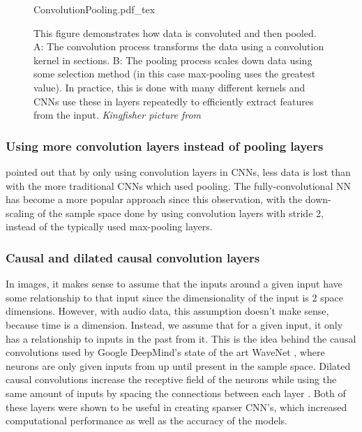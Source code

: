 \documentclass[12pt]{article}
\newcommand{\vectorimage}[1]{
    \def\svgwidth{5.5in}
    {#1.pdf_tex}
}
\begin{document}
	\begin{figure}[h!]
	    \centering
	    \vectorimage{ConvolutionPooling}
	    \caption{This figure demonstrates how data is convoluted and then pooled. A: The convolution process transforms the data using a convolution kernel in sections. B: The pooling process scales down data using some selection method (in this case max-pooling uses the greatest value). In practice, this is done with many different kernels and CNNs use these in layers repeatedly to efficiently extract features from the input. \textit{Kingfisher picture from \parencite{convolutionpooling}}}
	    \label{fig:convolution_pooling}
	\end{figure}
	
	\subsubsection{Using more convolution layers instead of pooling layers}
	\label{sec:strided_conv}
	
	\textcite{Springenberg2014} pointed out that by only using convolution layers in CNNs, less data is lost than with the more traditional CNNs which used pooling. The fully-convolutional NN has become a more popular approach since this observation, with the down-scaling of the sample space done by using convolution layers with stride 2, instead of the typically used max-pooling layers.\medskip
	
	\subsubsection{Causal and dilated causal convolution layers}
	\label{sec:dilated_causal_conv}
	
	In images, it makes sense to assume that the inputs around a given input have some relationship to that input since the dimensionality of the input is 2 space dimensions. However, with audio data, this assumption doesn't make sense, because time is a dimension. Instead, we assume that for a given input, it only has a relationship to inputs in the past from it. This is the idea behind the causal convolutions used by Google DeepMind's state of the art WaveNet \parencite{Oord2016}, where neurons are only given inputs from up until present in the sample space. Dilated causal convolutions increase the receptive field of the neurons while using the same amount of inputs by spacing the connections between each layer \parencite{Oord2016}. Both of these layers were shown to be useful in creating sparser CNN's, which increased computational performance as well as the accuracy of the models.\medskip
	
\end{document}
